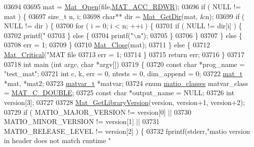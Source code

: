 \begin{DoxyCode}
{{{{{{{{{{{{{{{{{{{{{{{{{{{{{{{{{{{{{{{{{{{{{{{{{{{{{{{{{{{{{03694 
03695     mat = \hyperlink{group___m_a_t_gafbfedb5636a99f0ef867520c47f77d18}{Mat\_Open}(file,\hyperlink{group___m_a_t_ggaa9dcbc70f538af79bd557593ff6b5cdba0f65f27ea42fde32d62b702b82329c1f}{MAT\_ACC\_RDWR});
03696     \textcolor{keywordflow}{if} ( NULL != mat ) \{
03697         \textcolor{keywordtype}{size\_t} n, i;
03698         \textcolor{keywordtype}{char}** dir = \hyperlink{group___m_a_t_ga7c0d94860d782366ab93d9b6b068eaea}{Mat\_GetDir}(mat, &n);
03699         \textcolor{keywordflow}{if} ( NULL != dir ) \{
03700             \textcolor{keywordflow}{for} ( i = 0; i < n; ++i ) \{
03701                 \textcolor{keywordflow}{if} ( NULL != dir[i] ) \{
03702                     printf(\textcolor{stringliteral}{"%
03703                 \} \textcolor{keywordflow}{else} \{
03704                     printf(\textcolor{stringliteral}{"\(\backslash\)n"});
03705                 \}
03706             \}
03707         \} \textcolor{keywordflow}{else} \{
03708             err = 1;
03709         \}
03710         \hyperlink{group___m_a_t_ga101c92ff7bde4a2d4615661beba09262}{Mat\_Close}(mat);
03711     \} \textcolor{keywordflow}{else} \{
03712         \hyperlink{group__mat__util_gaf51f2bfbb5580f575e4dd79757e2b80c}{Mat\_Critical}(\textcolor{stringliteral}{"MAT file %
03713         err = 1;
03714     \}
03715     \textcolor{keywordflow}{return} err;
03716 \}
03717 
03718 \textcolor{keywordtype}{int} main (\textcolor{keywordtype}{int} argc, \textcolor{keywordtype}{char} *argv[])
03719 \{
03720     \textcolor{keyword}{const} \textcolor{keywordtype}{char} *prog\_name = \textcolor{stringliteral}{"test\_mat"};
03721     \textcolor{keywordtype}{int}   c, k, err = 0, ntests = 0, dim\_append = 0;
03722     \hyperlink{struct__mat__t}{mat\_t} *mat, *mat2;
03723     \hyperlink{group___m_a_t_structmatvar__t}{matvar\_t} *matvar;
03724     \textcolor{keyword}{enum} \hyperlink{group___m_a_t_gad4d60ae7b709fc81bfd744fb4c857c40}{matio\_classes} matvar\_class = \hyperlink{group___m_a_t_ggad4d60ae7b709fc81bfd744fb4c857c40a5d70e0862e5bdb7bd86bf7ba5948f307}{MAT\_C\_DOUBLE};
03725     \textcolor{keyword}{const} \textcolor{keywordtype}{char} *output\_name = NULL;
03726     \textcolor{keywordtype}{int} version[3];
03727 
03728     \hyperlink{mat_8c_a2069c4f0d1106778b56216ff4f95f94b}{Mat\_GetLibraryVersion}(version, version+1, version+2);
03729     \textcolor{keywordflow}{if} ( MATIO\_MAJOR\_VERSION != version[0] ||
03730          MATIO\_MINOR\_VERSION != version[1] ||
03731          MATIO\_RELEASE\_LEVEL != version[2] ) \{
03732         fprintf(stderr,\textcolor{stringliteral}{"matio version in header does not match runtime "}
}}}}}}}}}}}}}}}}}}}}}}}}}}}}}}}}}}}}}}}}}}}}}}}}}}}}}}}}}}}}}}}
\end{DoxyCode}
